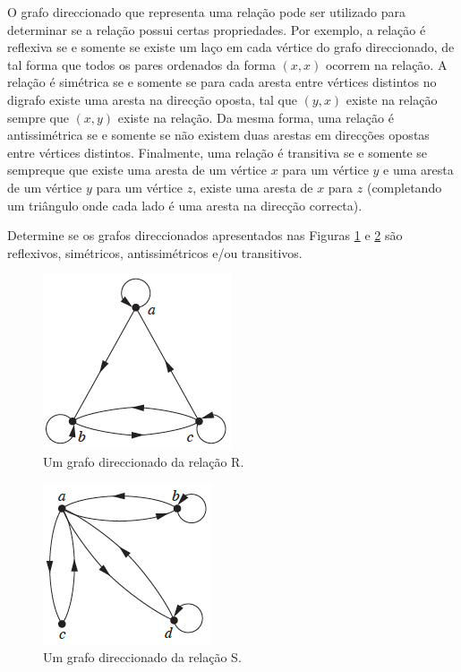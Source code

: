 O grafo direccionado que representa uma relação pode ser utilizado para
determinar se a relação possui certas propriedades.
Por exemplo, a relação é reflexiva se e somente se existe um laço em cada
vértice do grafo direccionado, de tal forma que todos os pares ordenados da
forma $(x,x)$ ocorrem na relação. A relação é simétrica se e somente se para
cada aresta entre vértices distintos no digrafo existe uma aresta na direcção
oposta, tal que $(y,x)$ existe na relação sempre que $(x,y)$ existe na relação.
Da mesma forma, uma relação é antissimétrica se e somente se não existem duas
arestas em direcções opostas entre vértices distintos. Finalmente, uma relação
é transitiva se e somente se sempreque que existe uma aresta de um vértice $x$
para um vértice $y$ e uma aresta de um vértice $y$ para um vértice $z$, existe
uma aresta de $x$ para $z$ (completando um triângulo onde cada lado é uma aresta
na direcção correcta).


\begin{description}
	\item[Exemplo \ref{exe616}]{Determine se os grafos direccionados apresentados
	nas Figuras \ref{Figura66} e \ref{Figura67} são reflexivos, simétricos,
	antissimétricos e/ou transitivos}.
\end{description}

\begin{figure}[H]
	\centering
	\includegraphics[scale=0.6]{chapter/imagens/66}
	\caption{Um grafo direccionado da relação R.}
	\label{Figura66}
\end{figure}

\begin{figure}[H]
	\centering
	\includegraphics[scale=0.6]{chapter/imagens/67}
	\caption{Um grafo direccionado da relação S.}
	\label{Figura67}
\end{figure}

